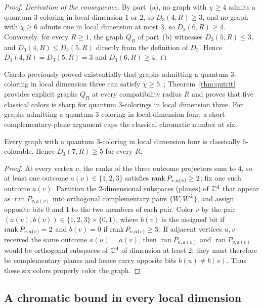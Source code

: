 \begin{proof}
\emph{Derivation of the consequence.} By part~(a), no graph with $\chi\ge4$ admits a quantum $3$-coloring in local dimension $1$ or $2$, so $D_3(4,R)\ge3$, and no graph with $\chi\ge6$ admits one in local dimension at most $3$, so $D_3(6,R)\ge4$. Conversely, for every $R\ge1$, the graph $Q_R$ of part~(b) witnesses $D_3(5,R)\le3$, and $D_3(4,R)\le D_3(5,R)$ directly from the definition of $D_3$. Hence $D_3(4,R)=D_3(5,R)=3$ and $D_3(6,R)\ge4$.
\end{proof}

Ciardo previously proved existentially that graphs admitting a quantum $3$-coloring in local dimension three can satisfy $\chi\ge5$~\cite[Corollary~35 and Example~36]{Ciardo24}; Theorem~\ref{thm:qutrit} provides explicit graphs $Q_R$ at every compatibility radius $R$ and proves that five classical colors is sharp for quantum $3$-colorings in local dimension three.
For graphs admitting a quantum $3$-coloring in local dimension four, a short complementary-plane argument caps the classical chromatic number at six.

\begin{proposition}\label{prop:dim-four}
Every graph with a quantum $3$-coloring in local dimension four is classically $6$-colorable. Hence $D_3(7,R)\ge5$ for every $R$.
\end{proposition}
\begin{proof}
At every vertex $v$, the ranks of the three outcome projectors sum to $4$, so at least one outcome $a(v)\in\{1,2,3\}$ satisfies $\operatorname{rank} P_{v,a(v)}\ge2$; fix one such outcome $a(v)$. Partition the $2$-dimensional subspaces (planes) of $\mathbb C^4$ that appear as $\operatorname{ran} P_{v,a(v)}$ into orthogonal complementary pairs $\{W,W^\perp\}$, and assign opposite bits $0$ and $1$ to the two members of each pair. Color $v$ by the pair $(a(v),b(v))\in\{1,2,3\}\times\{0,1\}$, where $b(v)$ is the assigned bit if $\operatorname{rank} P_{v,a(v)}=2$ and $b(v)=0$ if $\operatorname{rank} P_{v,a(v)}\ge3$. If adjacent vertices $u,v$ received the same outcome $a(u)=a(v)$, then $\operatorname{ran} P_{u,a(u)}$ and $\operatorname{ran} P_{v,a(v)}$ would be orthogonal subspaces of $\mathbb C^4$ of dimension at least $2$; they must therefore be complementary planes and hence carry opposite bits $b(u)\ne b(v)$. Thus these six colors properly color the graph.
\end{proof}

\subsection{A chromatic bound in every local dimension}\label{sec:rounding}

